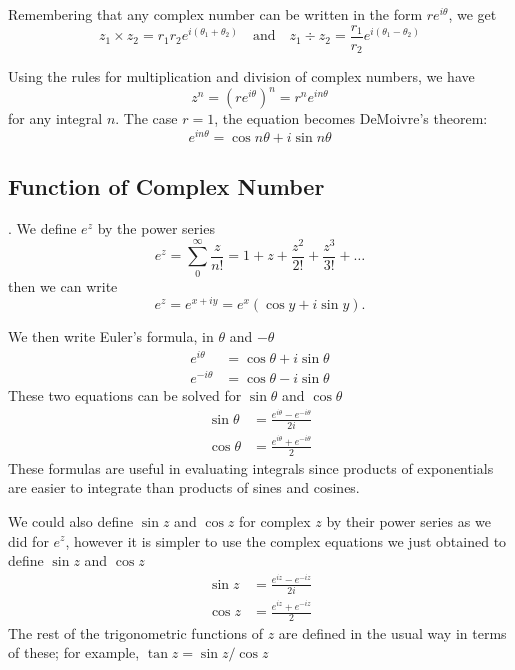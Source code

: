 \documentclass[../../../main.tex]{subfiles}
\begin{document}
Remembering that any complex number can be written in the form $re^{i\theta}$, we get
\begin{equation*}
    z_1\times z_2=r_1r_2e^{i(\theta_1+\theta_2)}\quad\text{and}\quad z_1\div z_2=\frac{r_1}{r_2}e^{i(\theta_1-\theta_2)}
\end{equation*}

Using the rules for multiplication and division of complex numbers, we have
\begin{equation*}
    z^n = (re^{i\theta})^n = r^ne^{in\theta}
\end{equation*}
for any integral $n$.  The case $r = 1$, the equation becomes DeMoivre's theorem:
\begin{equation*}
    e^{in\theta}=\cos n\theta + i \sin n\theta
\end{equation*}

\subsection{Function of Complex Number}. We define $e^z$ by the power series
\begin{equation*}
    e^z=\sum_{0}^{\infty}\frac{z}{n!}=1+z+\frac{z^2}{2!}+\frac{z^3}{3!}+\dots
\end{equation*}
then we can write 
\begin{equation*}
    e^z=e^{x+iy}  = e^x(\cos y + i \sin y).
\end{equation*}

We then write Euler's formula, in $\theta$ and $-\theta$
\begin{align*}
    e^{i\theta}&=\cos\theta+i\sin\theta\\
    e^{-i\theta}&=\cos\theta-i\sin\theta
\end{align*}
These two equations can be solved for $\sin\theta$ and $\cos\theta$
\begin{align*}
    \sin \theta&=\frac{e^{i\theta}-e^{-i\theta}}{2i}\\
    \cos \theta&=\frac{e^{i\theta}+e^{-i\theta}}{2}
\end{align*}
These formulas are useful in evaluating integrals since products of exponentials are 
easier to integrate than products of sines and cosines. 

We could also deﬁne $\sin z$ and $\cos z$ for complex $z$ by their power series as we did for $e^z$, however it is simpler to use the complex equations we just obtained to define  $\sin z$ and $\cos z$
\begin{align*}
    \sin z&=\frac{e^{iz}-e^{-iz}}{2i}\\
    \cos z&=\frac{e^{iz}+e^{-iz}}{2}
\end{align*}
The rest of the trigonometric functions of $z$ are deﬁned in the usual way in terms of these; for example, $\tan z = \sin z/ \cos z$
\end{document}
